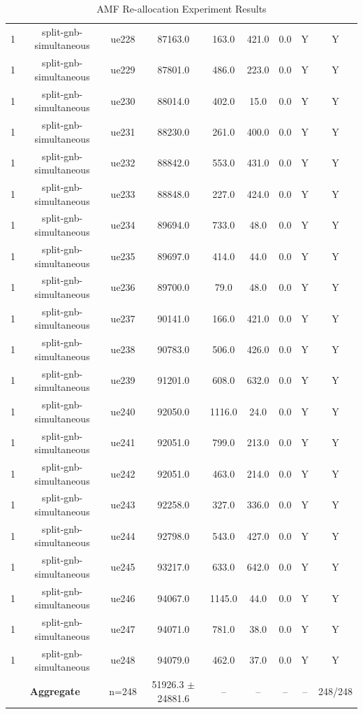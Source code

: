 \begin{table}[ht]
\begin{tabular}{|c|c|c|c|c|c|c|c|c|}
1 & split-gnb-simultaneous & ue228 & 87163.0 & 163.0 & 421.0 & 0.0 & Y & Y \\
1 & split-gnb-simultaneous & ue229 & 87801.0 & 486.0 & 223.0 & 0.0 & Y & Y \\
1 & split-gnb-simultaneous & ue230 & 88014.0 & 402.0 & 15.0 & 0.0 & Y & Y \\
1 & split-gnb-simultaneous & ue231 & 88230.0 & 261.0 & 400.0 & 0.0 & Y & Y \\
1 & split-gnb-simultaneous & ue232 & 88842.0 & 553.0 & 431.0 & 0.0 & Y & Y \\
1 & split-gnb-simultaneous & ue233 & 88848.0 & 227.0 & 424.0 & 0.0 & Y & Y \\
1 & split-gnb-simultaneous & ue234 & 89694.0 & 733.0 & 48.0 & 0.0 & Y & Y \\
1 & split-gnb-simultaneous & ue235 & 89697.0 & 414.0 & 44.0 & 0.0 & Y & Y \\
1 & split-gnb-simultaneous & ue236 & 89700.0 & 79.0 & 48.0 & 0.0 & Y & Y \\
1 & split-gnb-simultaneous & ue237 & 90141.0 & 166.0 & 421.0 & 0.0 & Y & Y \\
1 & split-gnb-simultaneous & ue238 & 90783.0 & 506.0 & 426.0 & 0.0 & Y & Y \\
1 & split-gnb-simultaneous & ue239 & 91201.0 & 608.0 & 632.0 & 0.0 & Y & Y \\
1 & split-gnb-simultaneous & ue240 & 92050.0 & 1116.0 & 24.0 & 0.0 & Y & Y \\
1 & split-gnb-simultaneous & ue241 & 92051.0 & 799.0 & 213.0 & 0.0 & Y & Y \\
1 & split-gnb-simultaneous & ue242 & 92051.0 & 463.0 & 214.0 & 0.0 & Y & Y \\
1 & split-gnb-simultaneous & ue243 & 92258.0 & 327.0 & 336.0 & 0.0 & Y & Y \\
1 & split-gnb-simultaneous & ue244 & 92798.0 & 543.0 & 427.0 & 0.0 & Y & Y \\
1 & split-gnb-simultaneous & ue245 & 93217.0 & 633.0 & 642.0 & 0.0 & Y & Y \\
1 & split-gnb-simultaneous & ue246 & 94067.0 & 1145.0 & 44.0 & 0.0 & Y & Y \\
1 & split-gnb-simultaneous & ue247 & 94071.0 & 781.0 & 38.0 & 0.0 & Y & Y \\
1 & split-gnb-simultaneous & ue248 & 94079.0 & 462.0 & 37.0 & 0.0 & Y & Y \\
\multicolumn{2}{|c|}{\textbf{Aggregate}} & n=248 & 51926.3 $\pm$ 24881.6 & -- & -- & -- & -- & 248/248 \\
\hline
\end{tabular}
\caption{AMF Re-allocation Experiment Results}
\label{tab:amf_realloc}
\end{table}
